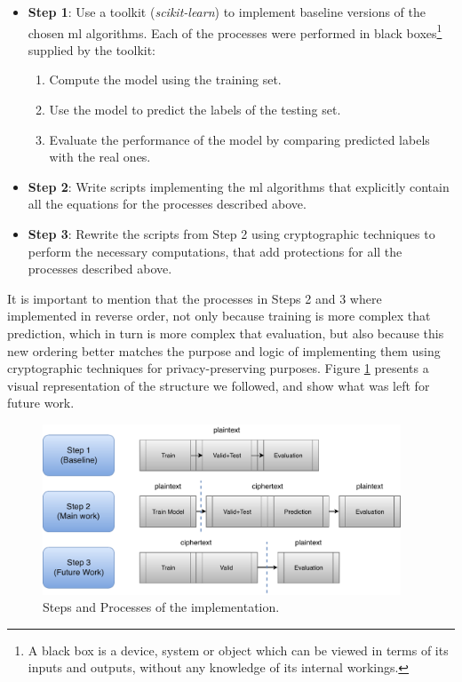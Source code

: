 \begin{itemize}

	\item \textbf{Step 1}: Use a toolkit (\textit{scikit-learn}) to implement baseline versions of the chosen \ac{ml} algorithms. Each of the processes were performed in black boxes\footnote{A black box is a device, system or object which can be viewed in terms of its inputs and outputs, without any knowledge of its internal workings.} supplied by the toolkit:
	\begin{enumerate}
		\item Compute the model using the training set.
		\item Use the model to predict the labels of the testing set.
		\item Evaluate the performance of the model by comparing predicted labels with the real ones.
	\end{enumerate}
	\item \textbf{Step 2}: Write scripts implementing the \ac{ml} algorithms that explicitly contain all the equations for the processes described above.
	\item \textbf{Step 3}: Rewrite the scripts from Step 2 using cryptographic techniques to perform the necessary computations, that add protections for all the processes described above.
\end{itemize}

It is important to mention that the processes in Steps 2 and 3 where implemented in reverse order, not only because training is more complex that prediction, which in turn is more complex that evaluation, but also because this new ordering better matches the purpose and logic of implementing them using cryptographic techniques for privacy-preserving purposes. Figure \ref{fig:steps} presents a visual representation of the structure we followed, and show what was left for future work.

\begin{figure}[ht]
    \centering
    \includegraphics[width=0.95\textwidth]{images/ImplementationSteps.pdf}
    \caption{Steps and Processes of the implementation.}
    \label{fig:steps}
 \end{figure}



